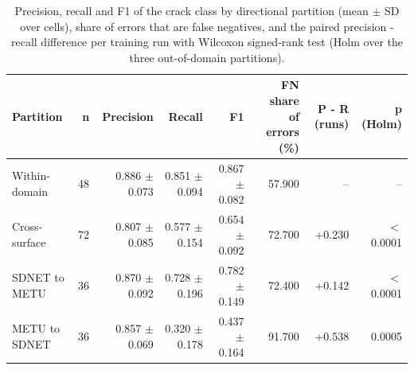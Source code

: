 \begin{table}[htbp]
\centering
\caption{Precision, recall and F1 of the crack class by directional partition (mean $\pm$ SD over cells), share of errors that are false negatives, and the paired precision - recall difference per training run with Wilcoxon signed-rank test (Holm over the three out-of-domain partitions).}
\label{tab:precision-recall}
\begin{tabular}{lrrrrrrr}
\toprule
Partition & n & Precision & Recall & F1 & FN share of errors (\%) & P - R (runs) & p (Holm) \\
\midrule
Within-domain & 48 & 0.886 $\pm$ 0.073 & 0.851 $\pm$ 0.094 & 0.867 $\pm$ 0.082 & 57.900 & -- & -- \\
Cross-surface & 72 & 0.807 $\pm$ 0.085 & 0.577 $\pm$ 0.154 & 0.654 $\pm$ 0.092 & 72.700 & +0.230 & $<$0.0001 \\
SDNET to METU & 36 & 0.870 $\pm$ 0.092 & 0.728 $\pm$ 0.196 & 0.782 $\pm$ 0.149 & 72.400 & +0.142 & $<$0.0001 \\
METU to SDNET & 36 & 0.857 $\pm$ 0.069 & 0.320 $\pm$ 0.178 & 0.437 $\pm$ 0.164 & 91.700 & +0.538 & 0.0005 \\
\bottomrule
\end{tabular}
\end{table}
